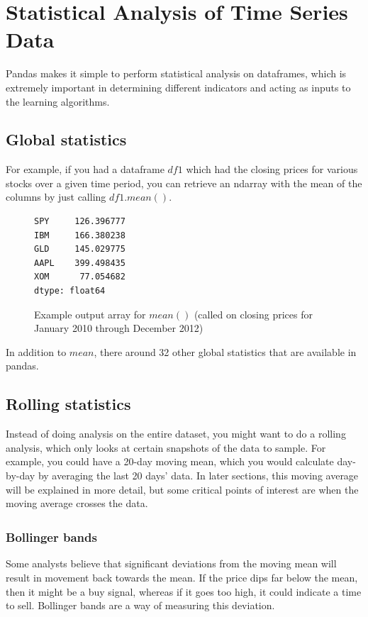 \chapter{Statistical Analysis of Time Series Data}

\noindent Pandas makes it simple to perform statistical analysis on dataframes, which is extremely important in determining different indicators and acting as inputs to the learning algorithms.\\

\section{Global statistics}
\noindent For example, if you had a dataframe $df1$ which had the closing prices for various stocks over a given time period, you can retrieve an ndarray with the mean of the columns by just calling $df1.mean()$.

\begin{figure}[h]
\begin{lstlisting}[style=python]
SPY     126.396777
IBM     166.380238
GLD     145.029775
AAPL    399.498435
XOM      77.054682
dtype: float64
\end{lstlisting}
\caption{Example output array for $mean()$ (called on closing prices for January 2010 through December 2012)}
\end{figure}

\noindent In addition to $mean$, there around 32 other global statistics that are available in pandas.

\section{Rolling statistics}

\noindent Instead of doing analysis on the entire dataset, you might want to do a rolling analysis, which only looks at certain snapshots of the data to sample. For example, you could have a 20-day moving mean, which you would calculate day-by-day by averaging the last 20 days' data. In later sections, this moving average will be explained in more detail, but some critical points of interest are when the moving average crosses the data.

\subsection{Bollinger bands\textsuperscript{\textregistered}}

\noindent Some analysts believe that significant deviations from the moving mean will result in movement back towards the mean. If the price dips far below the mean, then it might be a buy signal, whereas if it goes too high, it could indicate a time to sell. Bollinger bands are a way of measuring this deviation.\\

